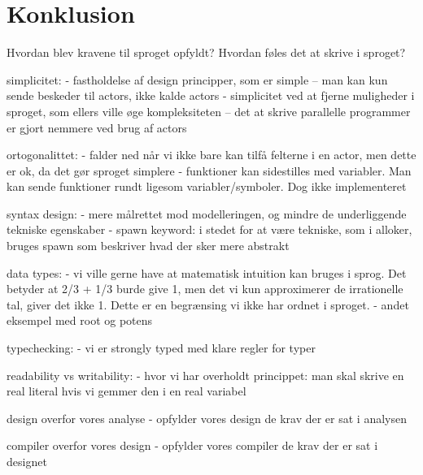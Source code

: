 \chapter{Konklusion}

Hvordan blev kravene til sproget opfyldt?
Hvordan føles det at skrive i sproget?

simplicitet:
- fastholdelse af design principper, som er simple
-- man kan kun sende beskeder til actors, ikke kalde actors
- simplicitet ved at fjerne muligheder i sproget, som ellers ville øge kompleksiteten
-- det at skrive parallelle programmer er gjort nemmere ved brug af actors

ortogonalittet:
- falder ned når vi ikke bare kan tilfå felterne i en actor, men dette er ok, da det gør sproget simplere
- funktioner kan sidestilles med variabler. Man kan sende funktioner rundt ligesom variabler/symboler. Dog ikke implementeret

syntax design:
- mere målrettet mod modelleringen, og mindre de underliggende tekniske egenskaber
- spawn keyword: i stedet for at være tekniske, som i alloker, bruges spawn som beskriver hvad der sker mere abstrakt

data types:
- vi ville gerne have at matematisk intuition kan bruges i sprog. Det betyder at 2/3 + 1/3 burde give 1, men det vi kun approximerer de irrationelle tal, giver det ikke 1. Dette er en begrænsing vi ikke har ordnet i sproget.
- andet eksempel med root og potens

typechecking:
- vi er strongly typed med klare regler for typer

readability vs writability:
- hvor vi har overholdt princippet: man skal skrive en real literal hvis vi gemmer den i en real variabel

design overfor vores analyse
- opfylder vores design de krav der er sat i analysen

compiler overfor vores design
- opfylder vores compiler de krav der er sat i designet